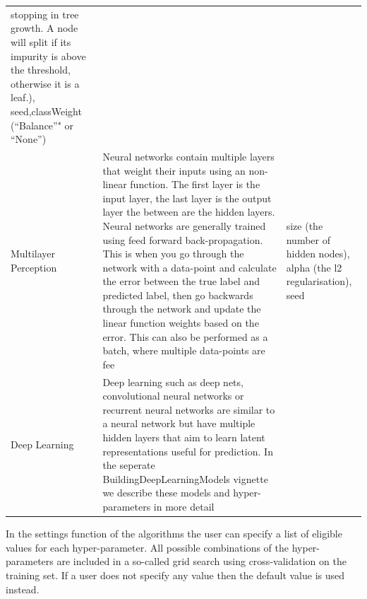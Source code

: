 \documentclass[]{article}
\begin{document}
\begin{longtable}[]{@{}lll@{}}
\begin{minipage}[t]{0.25\columnwidth}
stopping in tree growth. A node will split if its impurity is above the
threshold, otherwise it is a leaf.), seed,classWeight (``Balance''" or
``None'')\strut
\end{minipage}\tabularnewline
\begin{minipage}[t]{0.12\columnwidth}\raggedright\strut
Multilayer Perception\strut
\end{minipage} & \begin{minipage}[t]{0.55\columnwidth}\raggedright\strut
Neural networks contain multiple layers that weight their inputs using
an non-linear function. The first layer is the input layer, the last
layer is the output layer the between are the hidden layers. Neural
networks are generally trained using feed forward back-propagation. This
is when you go through the network with a data-point and calculate the
error between the true label and predicted label, then go backwards
through the network and update the linear function weights based on the
error. This can also be performed as a batch, where multiple data-points
are fee\strut
\end{minipage} & \begin{minipage}[t]{0.25\columnwidth}\raggedright\strut
size (the number of hidden nodes), alpha (the l2 regularisation),
seed\strut
\end{minipage}\tabularnewline
\begin{minipage}[t]{0.12\columnwidth}\raggedright\strut
Deep Learning\strut
\end{minipage} & \begin{minipage}[t]{0.55\columnwidth}\raggedright\strut
Deep learning such as deep nets, convolutional neural networks or
recurrent neural networks are similar to a neural network but have
multiple hidden layers that aim to learn latent representations useful
for prediction. In the seperate BuildingDeepLearningModels vignette we
describe these models and hyper-parameters in more detail\strut
\end{minipage} & \begin{minipage}[t]{0.25\columnwidth}\raggedright\strut
\strut
\end{minipage}\tabularnewline
\bottomrule
\end{longtable}

In the settings function of the algorithms the user can specify a list
of eligible values for each hyper-parameter. All possible combinations
of the hyper-parameters are included in a so-called grid search using
cross-validation on the training set. If a user does not specify any
value then the default value is used instead.
\end{document}
